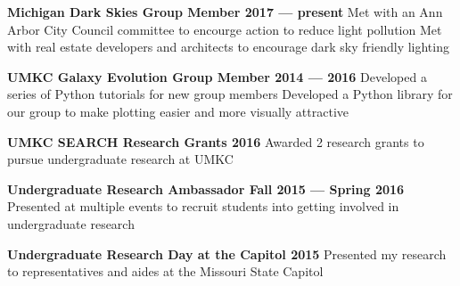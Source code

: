 \documentclass[10pt]{article}
\newcommand{\actionHeader}[2]{\textbf{#1 \hfill #2}}
\newcommand{\indentedItem}[1]{\newline\null\qquad #1}
\begin{document}
\actionHeader{Michigan Dark Skies Group Member}{2017 --- present}
\indentedItem{Met with an Ann Arbor City Council committee to encourge action to reduce light pollution}
\indentedItem{Met with real estate developers and architects to encourage dark sky friendly lighting}

\actionHeader{UMKC Galaxy Evolution Group Member}{2014 --- 2016}
\indentedItem{Developed a series of Python tutorials for new group members}
\indentedItem{Developed a Python library for our group to make plotting easier and more visually attractive}

\actionHeader{UMKC SEARCH Research Grants}{2016}
\indentedItem{Awarded 2 research grants to pursue undergraduate research at UMKC}

\actionHeader{Undergraduate Research Ambassador}{Fall 2015 --- Spring 2016}
\indentedItem{Presented at multiple events to recruit students into getting involved in undergraduate research}

\actionHeader{Undergraduate Research Day at the Capitol}{2015}
\indentedItem{Presented my research to representatives and aides at the Missouri State Capitol}
\end{document}
